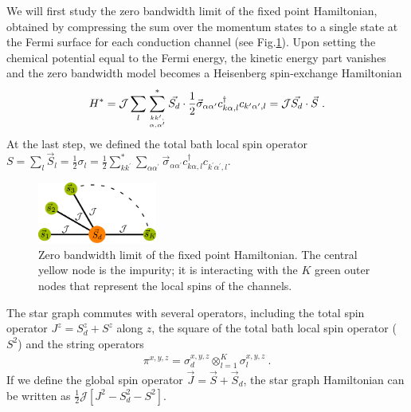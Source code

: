 \documentclass{iopart}
\begin{document}
We will first study the zero bandwidth limit of the fixed point Hamiltonian, obtained by compressing the sum over the momentum states to a single state at the Fermi surface for each conduction channel (see Fig.\ref{fig:star graph}). Upon setting the chemical potential equal to the Fermi energy, the kinetic energy part vanishes and the zero bandwidth model becomes a Heisenberg spin-exchange Hamiltonian
\begin{eqnarray}
	\label{star graph}
	H^* = {\mathcal{J}}\sum_l\sum_{kk^\prime,\atop{\alpha,\alpha^\prime}}^* \vec{S_d}\cdot\frac{1}{2}\vec{\sigma}_{\alpha\alpha^\prime}c_{k\alpha,l}^\dagger c_{k^\prime\alpha^\prime, l} = {\mathcal{J}}\vec{S_d}\cdot\vec S~.
\end{eqnarray}
At the last step, we defined the total bath local spin operator \(S = \sum_l \vec{S}_l = \frac{1}{2}\sigma_l = \frac{1}{2}\sum_{kk^\prime}^*\sum_{\alpha\alpha^\prime}\vec{\sigma}_{\alpha\alpha^\prime}c_{k\alpha,l}^\dagger c_{k^\prime\alpha^\prime, l}\).
\begin{figure}[htpb]
	\centering
	\includegraphics[width=0.35\textwidth]{stargraph.pdf}
	\caption{Zero bandwidth limit of the fixed point Hamiltonian. The central yellow node is the impurity; it is interacting with the \(K\) green outer nodes that represent the local spins of the channels.}
	\label{fig:star graph}
\end{figure}
The star graph commutes with several operators, including the total spin operator \(J^z = S_d^z + S^z\) along \(z\), the square of the total bath local spin operator (\(S^2\)) and the string operators 
\begin{eqnarray}
\pi^{x,y,z} = \sigma_d^{x,y,z} \otimes_{l=1}^K \sigma_l^{x,y,z}~.
\end{eqnarray}
If we define the global spin operator \(\vec J = \vec S + \vec S_d\), the star graph Hamiltonian can be written as \(\frac{1}{2}\mathcal{J}\left[J^2 - S_d^2 - S^2\right] \).
\end{document}
